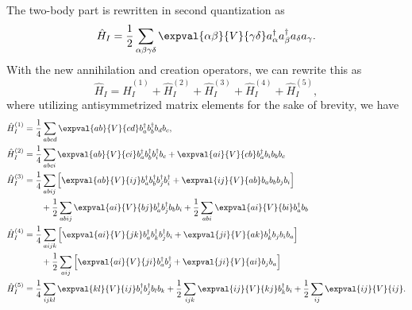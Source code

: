 The two-body part is rewritten in second quantization as
\begin{equation}
    \hat{H}_I = \frac{1}{2} \sum_{\alpha \beta \gamma \delta} \expval{\alpha \beta}{V}{\gamma \delta} a_\alpha^\dagger a_\beta^\dagger a_\delta a_\gamma.
\end{equation}
With the new annihilation and creation operators, we can rewrite this as
\begin{equation*}
    \hat{H}_I = \hat{H}_I^{(1)} + \hat{H}_I^{(2)} + \hat{H}_I^{(3)} + \hat{H}_I^{(4)} + \hat{H}_I^{(5)},
\end{equation*}
where utilizing antisymmetrized matrix elements for the sake of brevity, we have
\begin{align*}
    \hat{H}_I^{(1)} &= \frac{1}{4} \sum_{abcd} \expval{ab}{V}{cd} b_a^\dagger b_b^\dagger b_d b_c, \\
    \hat{H}_I^{(2)} &= \frac{1}{4} \sum_{abci} \expval{ab}{V}{ci} b_a^\dagger b_b^\dagger b_i^\dagger b_c + \expval{ai}{V}{cb} b_a^\dagger b_i b_b b_c \\
    \hat{H}_I^{(3)} &= \frac{1}{4} \sum_{abij} \left[\expval{ab}{V}{ij} b_a^\dagger b_b^\dagger b_j^\dagger b_i^\dagger + \expval{ij}{V}{ab} b_a b_b b_j b_i \right] \\
    &\qquad + \frac{1}{2} \sum_{abij} \expval{ai}{V}{bj} b_a^\dagger b_j^\dagger b_b b_i + \frac{1}{2} \sum_{abi} \expval{ai}{V}{bi} b_a^\dagger b_b \\
    \hat{H}_I^{(4)} &= \frac{1}{4} \sum_{aijk} \left[ \expval{ai}{V}{jk} b_a^\dagger b_k^\dagger b_j^\dagger b_i + \expval{ji}{V}{ak} b_k^\dagger b_j b_i b_a \right] \\
    &\qquad + \frac{1}{2} \sum_{aij} \left[ \expval{ai}{V}{ji} b_a^\dagger b_j^\dagger + \expval{ji}{V}{ai} b_j b_a \right] \\
    \hat{H}_I^{(5)} &= \frac{1}{4} \sum_{ijkl} \expval{kl}{V}{ij} b_i^\dagger b_j^\dagger b_l b_k + \frac{1}{2} \sum_{ijk} \expval{ij}{V}{kj} b_k^\dagger b_i + \frac{1}{2} \sum_{ij} \expval{ij}{V}{ij}.
\end{align*}

